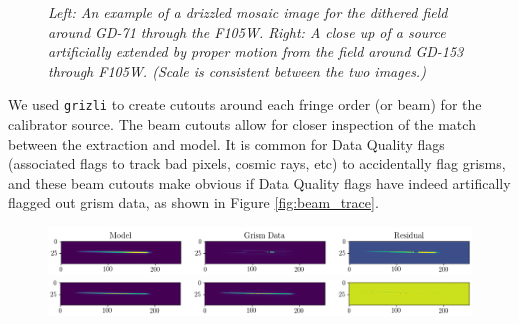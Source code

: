 \documentclass[12pt]{article}
\begin{document}
{{%
\begin{figure}[h!]
\caption{\textit{Left: An example of a drizzled mosaic image for the dithered field around GD-71 through the F105W.
    Right: A close up of a source artificially extended by proper motion from the field around GD-153 through F105W. 
    (Scale is consistent between the two images.)}}
\label{fig:mosaics}
\end{figure}

We used \texttt{grizli} to create cutouts around each fringe order (or beam) for the calibrator source. The
beam cutouts allow for closer inspection of the match between the extraction
and model. It is common for Data Quality flags (associated flags to track bad
pixels, cosmic rays, etc) to accidentally flag grisms, and these beam cutouts
make obvious if Data Quality flags have indeed artifically flagged out grism data, as shown in Figure 
\ref{fig:beam_trace}.


\begin{figure}[h!]
    \includegraphics[width=1\textwidth]{images/ex_mod_res.png}\\
   \includegraphics[width=1\textwidth]{images/better_mod_res.png}
    

\end{figure}}}
\end{document}
